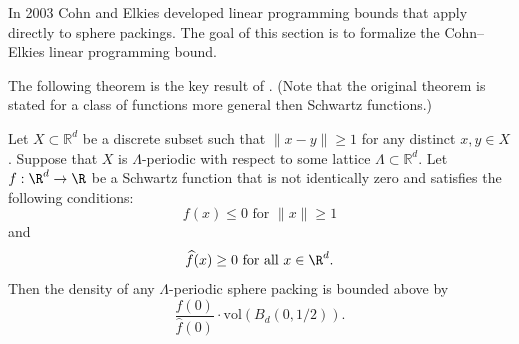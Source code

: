 In 2003 Cohn and Elkies \cite{ElkiesCohn}  developed  linear programming bounds that apply directly to sphere packings. The goal of this section is to formalize the Cohn--Elkies linear programming bound.

The following theorem is the key result of \cite{ElkiesCohn}. (Note that the original theorem is stated for a class of functions more general then Schwartz functions.)
\begin{theorem}\label{thm:Cohn-Elkies-periodic}\leanok

Let $X\subset\mathbb{R}^d$ be a discrete subset such that $\|x-y\|\geq 1$ for any distinct $x,y\in X$. Suppose that $X$ is $\Lambda$-periodic with respect to some lattice $\Lambda\subset\mathbb{R}^d$. Let $f:\R^d\to\R$ be a Schwartz function that is not identically zero and satisfies the following conditions:
\begin{equation}\label{eqn:Cohn-Elkies-condition-1}f(x)\leq 0\mbox{ for } \|x\|\geq 1\end{equation} and
\begin{equation}\label{eqn:Cohn-Elkies-condition-2}\widehat{f}(x)\geq0\mbox{ for all } x\in\R^d.\end{equation}
  Then the density of any $\Lambda$-periodic sphere packing is bounded above by $$\frac{f(0)}{\widehat{f}(0)}\cdot \mathrm{vol}(B_d(0,1/2)).$$
\end{theorem}
